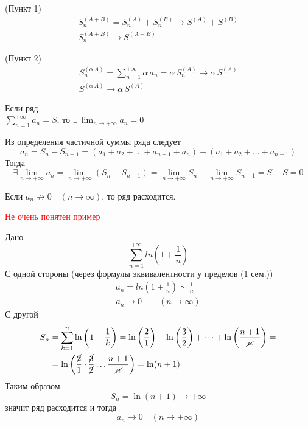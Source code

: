 \begin{Proof} (Пункт 1)
    \begin{gather*}
        S^{(A+B)}_n = S^{(A)}_n + S^{(B)}_n \rightarrow S^{(A)} + S^{(B)}\\
        S^{(A+B)}_n \rightarrow S^{(A+B)}
    \end{gather*}
\end{Proof}

\begin{Proof} (Пункт 2)
    \begin{gather*}
        S^{(\alpha\,A)}_n = \sum^{+\infty}_{n=1}\alpha\,a_n = \alpha\,S^{(A)}_n \rightarrow \alpha\,S^{(A)}\\ S^{(\alpha\,A)} \rightarrow \alpha\,S^{(A)}
    \end{gather*}
\end{Proof}

\begin{Th}
	Если ряд\\ $\sum^{+\infty}_{n=1}a_n = S$, то $\exists\, \lim_{n \rightarrow +\infty}a_n = 0$
\end{Th}

\begin{Proof}
    Из определения частичной суммы ряда следует
	\[
        a_n = S_n - S_{n - 1} = (a_1 + a_2 + \dots + a_{n-1} + a_n) - (a_1 + a_2 + \dots + a_{n-1})
    \]
    Тогда 
    \[
        \exists \lim_{n \rightarrow +\infty}a_n = \lim_{n \rightarrow +\infty}(S_n - S_{n-1}) = \lim_{n \rightarrow +\infty}S_n - \lim_{n \rightarrow +\infty}S_{n - 1} = S - S = 0
    \]
\end{Proof}

\begin{Note}
	Если $a_n \nrightarrow 0 \quad (n \rightarrow \infty)$, то ряд расходится.
\end{Note}

\textcolor{red}{Не очень понятен пример}
\begin{Example}
    Дано
	\[
        \sum^{+\infty}_{n=1}ln(1 + \frac{1}{n})
    \]
    С одной стороны (через формулы эквивалентности у пределов (1 сем.))
    \begin{gather*}
        a_n = ln(1 + \frac{1}{n}) \sim \frac{1}{n}\\
        a_n \rightarrow 0 \qquad (n \rightarrow \infty)
    \end{gather*}
    С другой
    \begin{align*}
        S_n &= \sum^{n}_{k=1}\ln\left(1 + \frac{1}{k}\right) = \ln\left(\frac{2}{1}\right) + \ln\left(\frac{3}{2}\right) + \dots + \ln\left(\frac{n + 1}{\cancel{n}}\right) =\\
        &= \ln\left(\frac{\cancel{2}}{1} \cdot \frac{\cancel{3}}{\cancel{2}} \dots \frac{n + 1}{\cancel{n}}\right) = \ln(n + 1)
    \end{align*}
    Таким образом
    \[
        S_n = \ln(n + 1) \rightarrow +\infty 
    \]
    значит ряд расходится и тогда 
    \[
        a_n \rightarrow 0 \quad (n \rightarrow +\infty)
    \]
\end{Example}

